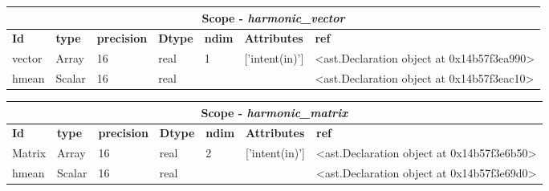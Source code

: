 \documentclass{report}
\begin{document}
 \vspace{1cm}

\begin{center}
\begin{longtable}{|p{3.5cm}|p{1.5cm}|p{1.5cm}|p{1.5cm}|p{1cm}|p{2cm}|p{4cm}| }
\hline
\multicolumn{7}{|c|}{\textbf{Scope} -  \textbf{\textit{harmonic\_vector}}} \\ 
\hline
\textbf{Id} & \textbf{type} & \textbf{precision} & \textbf{Dtype} & \textbf{ndim} & \textbf{Attributes} & \textbf{ref} \\\hline

vector & Array & 16 & real & 1 & ['intent(in)'] & <ast.Declaration object at 0x14b57f3ea990> \\\hline

hmean & Scalar & 16 & real &  &  & <ast.Declaration object at 0x14b57f3eac10> \\\hline

\end{longtable}
\end{center}

 \vspace{1cm}

\begin{center}
\begin{longtable}{|p{3.5cm}|p{1.5cm}|p{1.5cm}|p{1.5cm}|p{1cm}|p{2cm}|p{4cm}| }
\hline
\multicolumn{7}{|c|}{\textbf{Scope} -  \textbf{\textit{harmonic\_matrix}}} \\ 
\hline
\textbf{Id} & \textbf{type} & \textbf{precision} & \textbf{Dtype} & \textbf{ndim} & \textbf{Attributes} & \textbf{ref} \\\hline

Matrix & Array & 16 & real & 2 & ['intent(in)'] & <ast.Declaration object at 0x14b57f3e6b50> \\\hline

hmean & Scalar & 16 & real &  &  & <ast.Declaration object at 0x14b57f3e69d0> \\\hline

\end{longtable}
\end{center}

 \vspace{1cm}
\end{document}
